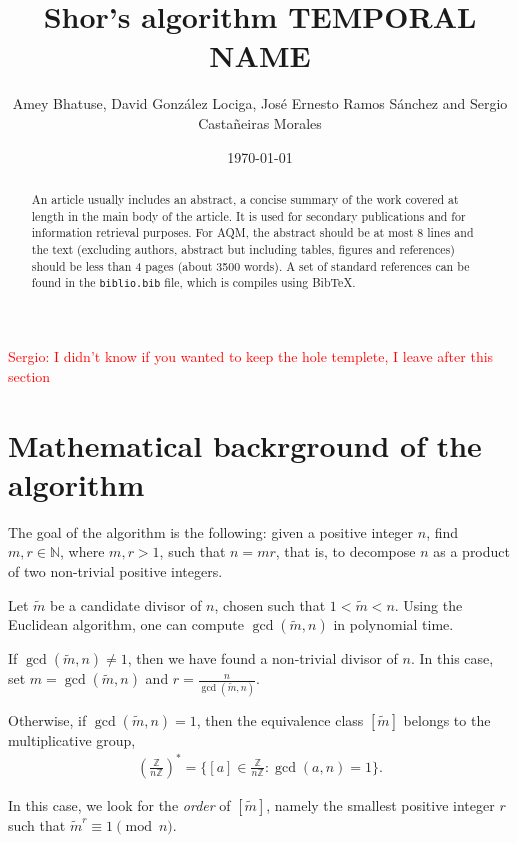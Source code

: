 \documentclass[aps,prl,twocolumn,superscriptaddress,groupedaddress]{revtex4}  %
\begin{document}
\title{Shor's algorithm TEMPORAL NAME}

\date{\today}

\author{Amey Bhatuse, David González Lociga, José Ernesto Ramos Sánchez and Sergio Castañeiras Morales} %

\begin{abstract}
An article usually includes an abstract, a concise summary of the work
covered at length in the main body of the article. It is used for
secondary publications and for information retrieval purposes.
For AQM, the abstract should be at most 8 lines and the text
 (excluding authors, abstract but including tables,
figures and references) should be less than 4 pages (about 3500 words).
A set of standard references can be found in the 
\verb+biblio.bib+ file, which is compiles using BibTeX.
\end{abstract}
\maketitle
\textcolor{red}{Sergio: I didn't know if you wanted to keep the hole templete, I leave after this section}
\section{\label{sec:MathematicalBackrground}Mathematical backrground of the algorithm}

The goal of the algorithm is the following: given a positive integer $n$, find $m, r \in \mathbb{N}$, where $m,r>1$, such that $n = m r$, that is, to decompose $n$ as a product of two non-trivial positive integers.

Let $\tilde{m}$ be a candidate divisor of $n$, chosen such that $1 < \tilde{m} < n$. Using the Euclidean algorithm, one can compute $\gcd(\tilde{m}, n)$ in polynomial time.  

If $\gcd(\tilde{m}, n) \neq 1$, then we have found a non-trivial divisor of $n$. In this case, set $m = \gcd(\tilde{m}, n)$ and $r = \frac{n}{\gcd(\tilde{m}, n)}$.

Otherwise, if $\gcd(\tilde{m}, n) = 1$, then the equivalence class $[\tilde{m}]$ belongs to the multiplicative group,
\begin{align*}
    \left(\tfrac{\mathbb{Z}}{n\mathbb{Z}}\right)^* 
    = \{ [a] \in \tfrac{\mathbb{Z}}{n\mathbb{Z}} : \gcd(a,n)=1 \}.
\end{align*}

    In this case, we look for the \emph{order} of $[\tilde{m}]$, namely the smallest positive integer $r$ such that $\tilde{m}^r \equiv 1 \pmod{n}$.
\end{document}

